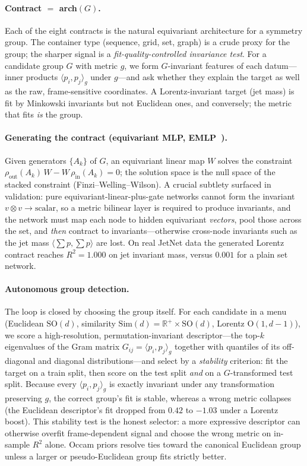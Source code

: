 \documentclass[11pt]{article}
\begin{document}
\paragraph{Contract $=$ arch$(G)$.} Each of the eight contracts is the natural equivariant
architecture for a symmetry group. The container type (sequence, grid, set, graph) is a crude proxy
for the group; the sharper signal is a \emph{fit-quality-controlled invariance test}. For a candidate
group $G$ with metric $g$, we form $G$-invariant features of each datum---inner products
$\langle p_i,p_j\rangle_g$ under $g$---and ask whether they explain the target as well as the raw,
frame-sensitive coordinates. A Lorentz-invariant target (jet mass) is fit by Minkowski invariants but
not Euclidean ones, and conversely; the metric that fits \emph{is} the group.

\paragraph{Generating the contract (equivariant MLP, EMLP~\cite{finzi2021emlp}).} Given generators $\{A_k\}$ of $G$, an equivariant linear
map $W$ solves the constraint $\rho_{\text{out}}(A_k)\,W-W\,\rho_{\text{in}}(A_k)=0$; the solution
space is the null space of the stacked constraint (Finzi--Welling--Wilson). A crucial subtlety
surfaced in validation: pure equivariant-linear-plus-gate networks cannot form the invariant
$v\otimes v\to\text{scalar}$, so a metric bilinear layer is required to produce invariants, and the
network must map each node to hidden equivariant \emph{vectors}, pool those across the set, and
\emph{then} contract to invariants---otherwise cross-node invariants such as the jet mass
$\langle\sum p,\sum p\rangle$ are lost. On real JetNet data the generated Lorentz contract reaches
$R^2=1.000$ on jet invariant mass, versus $0.001$ for a plain set network.

\paragraph{Autonomous group detection.} The loop is closed by choosing the group itself. For each
candidate in a menu (Euclidean $\mathrm{SO}(d)$, similarity $\mathrm{Sim}(d)=\mathbb{R}^+\times
\mathrm{SO}(d)$, Lorentz $\mathrm{O}(1,d-1)$), we score a high-resolution, permutation-invariant
descriptor---the top-$k$ eigenvalues of the Gram matrix $G_{ij}=\langle p_i,p_j\rangle_g$ together
with quantiles of its off-diagonal and diagonal distributions---and select by a \emph{stability}
criterion: fit the target on a train split, then score on the test split \emph{and} on a
$G$-transformed test split. Because every $\langle p_i,p_j\rangle_g$ is exactly invariant under any
transformation preserving $g$, the correct group's fit is stable, whereas a wrong metric collapses
(the Euclidean descriptor's fit dropped from $0.42$ to $-1.03$ under a Lorentz boost). This stability
test is the honest selector: a more expressive descriptor can otherwise overfit frame-dependent
signal and choose the wrong metric on in-sample $R^2$ alone. Occam priors resolve ties toward the
canonical Euclidean group unless a larger or pseudo-Euclidean group fits strictly better.
\end{document}
